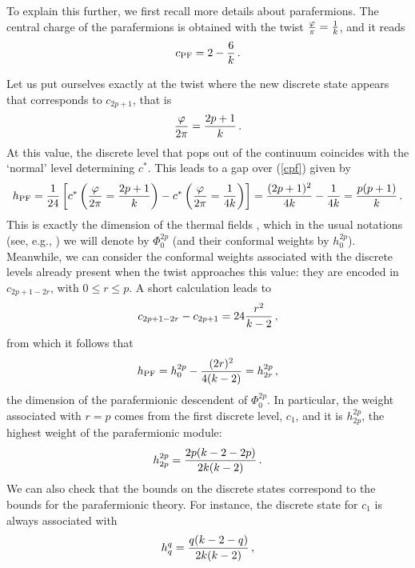 \documentclass[11pt]{article}
\begin{document}
To explain this further, we first  recall more details about parafermions.  The central charge of the parafermions is obtained with the twist ${\varphi\over\pi}={1\over k}$, and it reads
%
\begin{equation}
c_{\rm PF}=2-{6\over k} \,. \label{cpf}
\end{equation}
%




Let us put ourselves exactly at the twist where the new discrete state appears that corresponds to $c_{2p+1}$, that is 
%
\begin{equation}
{\varphi\over2\pi}={2p+1\over k} \,.
\end{equation}
%
At this value, the discrete level that pops out of the continuum coincides with the `normal' level determining $c^*$. This leads to a gap over (\ref{cpf}) given by
%
\begin{equation}
h_{\rm PF}={1\over 24}\left[c^*\left({\varphi\over2\pi}={2p+1\over k}\right)-c^*\left({\varphi\over2\pi}={1\over 4k}\right)\right]={(2p+1)^2\over 4k}-{1\over 4k}={p(p+1)\over k} \,.
\end{equation}
%
This is exactly the dimension of the thermal fields \cite{FZparafermions}, which in the usual notations (see, e.g., \cite{GepnerQiu}) we will denote by $\Phi_0^{2p}$ (and their conformal weights by $h^{2p}_0$). Meanwhile, we can consider the conformal weights associated with the discrete levels already present when the twist approaches this value: they are encoded in $c_{2p+1-2r}$, with $0\leq r\leq p$. A short calculation leads to
%
\begin{equation}
c_{2p+1-2r}-c_{2p+1}=24 {r^2\over k-2} \,,
\end{equation}
%
from which it follows that 
%
\begin{equation}
h_{\rm PF}=h^{2p}_0-{(2r)^2\over 4(k-2)}=h^{2p}_{2r} \,,
\end{equation}
%
the dimension of the parafermionic descendent of $\Phi^{2p}_0$. In particular, the weight associated with $r=p$ comes from the first discrete level, $c_1$, and it is $h_{2p}^{2p}$, the highest weight of the parafermionic module:
%
\begin{equation}
h_{2p}^{2p}={2p(k-2-2p)\over 2k(k-2)} \,.
\end{equation}
%
We can also check that the bounds on the discrete states correspond to the bounds for the parafermionic theory. For instance, the discrete state for $c_1$ is always associated with 
%
\begin{equation}
h_q^q={q(k-2-q)\over 2k(k-2)} \,,
\end{equation}
\end{document}
